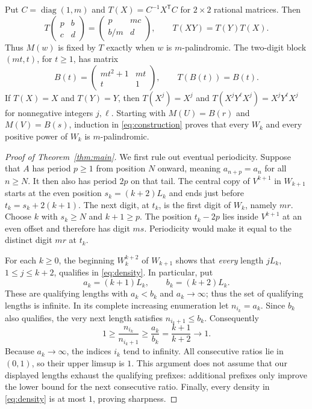 \documentclass[11pt]{article}
\begin{document}
Put $C=\operatorname{diag}(1,m)$ and $T(X)=C^{-1}X^{\mathsf T}C$ for
$2\times2$ rational matrices. Then
\[
 T\!\begin{pmatrix}p&b\\c&d\end{pmatrix}
 =\begin{pmatrix}p&mc\\b/m&d\end{pmatrix},\qquad
 T(XY)=T(Y)T(X).
\]
Thus $M(w)$ is fixed by $T$ exactly when $w$ is $m$-palindromic.
The two-digit block $(mt,t)$, for $t\geq1$, has matrix
\[
 B(t)=\begin{pmatrix}mt^2+1&mt\\t&1\end{pmatrix},
 \qquad T(B(t))=B(t).
\]
If $T(X)=X$ and $T(Y)=Y$, then $T(X^j)=X^j$ and
$T(X^jY^\ell X^j)=X^jY^\ell X^j$ for nonnegative integers $j,\ell$.
Starting with $M(U)=B(r)$ and $M(V)=B(s)$, induction in
\eqref{eq:construction} proves that every $W_k$ and every positive power
of $W_k$ is $m$-palindromic.

\begin{proof}[Proof of Theorem~\ref{thm:main}]
We first rule out eventual periodicity. Suppose that $A$ has period
$p\geq1$ from position $N$ onward, meaning $a_{n+p}=a_n$ for all $n\geq N$.
It then also has period $2p$ on that tail. The central copy of $V^{k+1}$ in
$W_{k+1}$ starts at the even position
$s_k=(k+2)L_k$ and ends just before $t_k=s_k+2(k+1)$.
The next digit, at $t_k$, is the first digit of $W_k$, namely $mr$.
Choose $k$ with $s_k\geq N$ and $k+1\geq p$. The position $t_k-2p$
lies inside $V^{k+1}$ at an even offset and therefore has digit $ms$.
Periodicity would make it equal to the distinct digit $mr$ at $t_k$.

For each $k\geq0$, the beginning $W_k^{k+2}$ of $W_{k+1}$ shows that
\emph{every} length $jL_k$, $1\leq j\leq k+2$, qualifies in
\eqref{eq:density}. In particular, put
\[
 a_k=(k+1)L_k,\qquad b_k=(k+2)L_k.
\]
These are qualifying lengths with $a_k<b_k$ and $a_k\to\infty$; thus the
set of qualifying lengths is infinite. In its complete increasing enumeration
let $n_{i_k}=a_k$. Since $b_k$ also qualifies, the very next length satisfies
$n_{i_k+1}\leq b_k$. Consequently
\[
 1\geq\frac{n_{i_k}}{n_{i_k+1}}
 \geq\frac{a_k}{b_k}=\frac{k+1}{k+2}\longrightarrow1.
\]
Because $a_k\to\infty$, the indices $i_k$ tend to infinity. All consecutive
ratios lie in $(0,1)$, so their upper limsup is $1$. This argument does not
assume that our displayed lengths exhaust the qualifying prefixes: additional
prefixes only improve the lower bound for the next consecutive ratio.
Finally, every density in \eqref{eq:density} is at most $1$, proving sharpness.
\end{proof}
\end{document}
